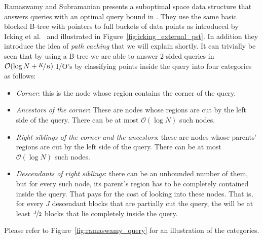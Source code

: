 \documentclass[twoside,11pt,openright]{report}
\begin{document}
Ramaswamy and Subramanian presents a suboptimal space data structure that answers queries with an optimal query bound in \cite{Ramaswamy:1994:PCT:182591.182595}. They use the same basic blocked B-tree with pointers to full buckets of data points as introduced by Icking et al.~\cite{Icking1988} and illustrated in Figure~\ref{fig:icking_external_pst}. In addition they introduce the idea of \textit{path caching} that we will explain shortly. It can trivially be seen that by using a B-tree we are able to answer 2-sided queries in $\mathcal{O}(\log N + \nicefrac{K}{B})$ I/O's by classifying points inside the query into four categories as follows:

\begin{itemize}
	\item \textit{Corner}: this is the node whose region contains the corner of the query.
	\item \textit{Ancestors of the corner}: These are nodes whose regions are cut by the left side of the query. There can be at most $\mathcal{O}(\log N)$ such nodes.
	\item \textit{Right siblings of the corner and the ancestors}: these are nodes whose parents' regions are cut by the left side of the query. There can be at most $ \mathcal{O}(\log N)$ such nodes.
	\item \textit{Descendants of right siblings}: there can be an unbounded number of them, but for every such node, its parent's region has to be completely contained inside the query. That pays for the cost of looking into these nodes. That is, for every $J$ descendant blocks that are partially cut the query, the will be at least $\nicefrac{J}{2}$ blocks that lie completely inside the query. 

\end{itemize} 
 
Please refer to Figure~\ref{fig:ramaswamy_query} for an illustration of the categories.
\end{document}
